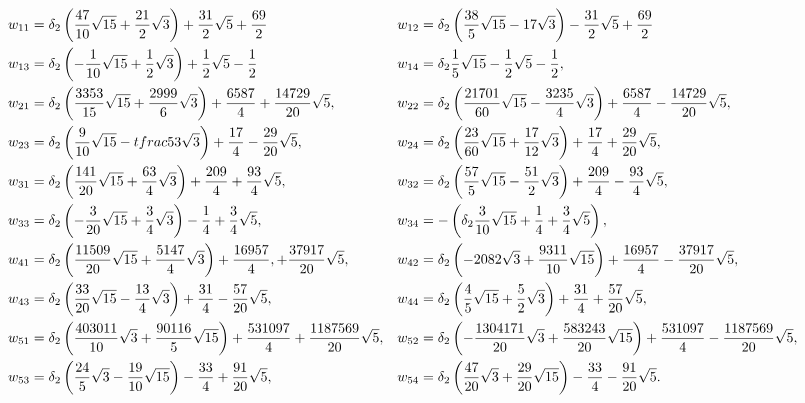 \documentclass[11pt]{amsart}
\begin{document}
{ 
	\scriptsize
	\begin{align*}
		w_{11} & = \delta_2 \left(\frac{47}{10}\sqrt{15}+\frac{21}{2}\sqrt{3}\right)+\frac{31}{2}\sqrt{5} +\frac{69}{2}  &
		w_{12} & =\delta_2 \left(\frac{38}{5}\sqrt{15}-17\sqrt{3}\right)-\frac{31}{2}\sqrt{5}+\frac{69}{2}  \\
		w_{13} & = \delta_2 \left(-\frac{1}{10}\sqrt{15}+\frac{1}{2}\sqrt{3}\right)+\frac{1}{2}\sqrt{5}-\frac{1}{2}  &
		w_{14} & = \delta_2 \frac{1}{5}\sqrt{15}-\frac{1}{2}\sqrt{5}-\frac{1}{2}, \\
		w_{21} & =\delta_2\left(\frac{3353}{15}\sqrt{15}+\frac{2999}{6}\sqrt{3}\right)+\frac{6587}{4} +\frac{14729}{20}\sqrt{5}, &
		w_{22} &=\delta_2\left(\frac{21701}{60}\sqrt{15}-\frac{3235}{4}\sqrt{3}\right)+\frac{6587}{4}-\frac{14729}{20}\sqrt{5}, \\
		w_{23} & =\delta_2\left(\frac{9}{10}\sqrt{15}-tfrac{5}{3}\sqrt{3}\right)+\frac{17}{4}-\frac{29}{20}\sqrt{5}, & 
		w_{24} & =\delta_2\left(\frac{23}{60}\sqrt{15}+\frac{17}{12}\sqrt{3}\right)+\frac{17}{4}+\frac{29}{20}\sqrt{5},\\
		w_{31} & =\delta_2\left(\frac{141}{20}\sqrt{15}+\frac{63}{4}\sqrt{3}\right)+\frac{209}{4}+\frac{93}{4}\sqrt{5}, &
		w_{32} & =\delta_2\left(\frac{57}{5}\sqrt{15}-\frac{51}{2}\sqrt{3}\right)+\frac{209}{4}-\frac{93}{4}\sqrt{5},\\
		w_{33} & = \delta_2\left(-\frac{3}{20}\sqrt{15}+\frac{3}{4}\sqrt{3}\right)-\frac{1}{4}+\frac{3}{4}\sqrt{5}, & 
		w_{34} &=	-\left(\delta_2\frac{3}{10}\sqrt{15}+\frac{1}{4}+\frac{3}{4}\sqrt{5}\right),\\
		w_{41} & =\delta_2\left(\frac{11509}{20}\sqrt{15}+\frac{5147}{4}\sqrt{3}\right)+\frac{16957}{4},
		+\frac{37917}{20}\sqrt{5}, &
		w_{42} & =\delta_2\left(-2082\sqrt{3}+\frac{9311}{10}\sqrt{15}\right)+\frac{16957}{4}-\frac{37917}{20}\sqrt{5}, \\
		w_{43} & =\delta_2\left(\frac{33}{20}\sqrt{15}-\frac{13}{4}\sqrt{3}\right)+\frac{31}{4}-\frac{57}{20}\sqrt{5}, &
		w_{44} & =\delta_2\left(\frac{4}{5}\sqrt{15}+\frac{5}{2}\sqrt{3}\right)+\frac{31}{4}+\frac{57}{20}\sqrt{5},		\\
		w_{51} & ={\tiny \delta_2\left(\frac{403011}{10}\sqrt{3}+\frac{90116}{5}\sqrt{15}\right)+\frac{531097}{4}+\frac{1187569}{20}\sqrt{5},} &
		w_{52} & ={\tiny \delta_2\left(-\frac{1304171}{20}\sqrt{3}+\frac{583243}{20}\sqrt{15}\right)+\frac{531097}{4}-\frac{1187569}{20}\sqrt{5},} \\
		w_{53} & = \delta_2\left(\frac{24}{5}\sqrt{3}-\frac{19}{10}\sqrt{15}\right)-\frac{33}{4}+\frac{91}{20}\sqrt{5},&
		w_{54} & =\delta_2\left(\frac{47}{20}\sqrt{3}+\frac{29}{20}\sqrt{15}\right)-\frac{33}{4}
		-\frac{91}{20}\sqrt{5}.
\end{align*}}
\end{document}
